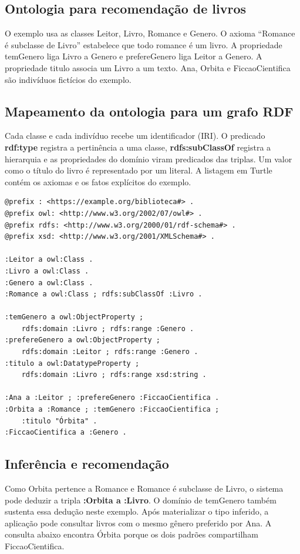 \documentclass[12pt,a4paper]{article}
\begin{document}
\subsection{Ontologia para recomendação de livros}

O exemplo usa as classes Leitor, Livro, Romance e Genero. O axioma ``Romance é subclasse de Livro'' estabelece que todo romance é um livro. A propriedade temGenero liga Livro a Genero e prefereGenero liga Leitor a Genero. A propriedade titulo associa um Livro a um texto. Ana, Orbita e FiccaoCientifica são indivíduos fictícios do exemplo.

\subsection{Mapeamento da ontologia para um grafo RDF}

Cada classe e cada indivíduo recebe um identificador (IRI). O predicado \textbf{rdf:type} registra a pertinência a uma classe, \textbf{rdfs:subClassOf} registra a hierarquia e as propriedades do domínio viram predicados das triplas. Um valor como o título do livro é representado por um literal. A listagem em Turtle contém os axiomas e os fatos explícitos do exemplo.

\begin{lstlisting}
@prefix : <https://example.org/biblioteca#> .
@prefix owl: <http://www.w3.org/2002/07/owl#> .
@prefix rdfs: <http://www.w3.org/2000/01/rdf-schema#> .
@prefix xsd: <http://www.w3.org/2001/XMLSchema#> .

:Leitor a owl:Class .
:Livro a owl:Class .
:Genero a owl:Class .
:Romance a owl:Class ; rdfs:subClassOf :Livro .

:temGenero a owl:ObjectProperty ;
    rdfs:domain :Livro ; rdfs:range :Genero .
:prefereGenero a owl:ObjectProperty ;
    rdfs:domain :Leitor ; rdfs:range :Genero .
:titulo a owl:DatatypeProperty ;
    rdfs:domain :Livro ; rdfs:range xsd:string .

:Ana a :Leitor ; :prefereGenero :FiccaoCientifica .
:Orbita a :Romance ; :temGenero :FiccaoCientifica ;
    :titulo "Órbita" .
:FiccaoCientifica a :Genero .
\end{lstlisting}

\subsection{Inferência e recomendação}

Como Orbita pertence a Romance e Romance é subclasse de Livro, o sistema pode deduzir a tripla \textbf{:Orbita a :Livro}. O domínio de temGenero também sustenta essa dedução neste exemplo. Após materializar o tipo inferido, a aplicação pode consultar livros com o mesmo gênero preferido por Ana. A consulta abaixo encontra Órbita porque os dois padrões compartilham FiccaoCientifica.
\end{document}
